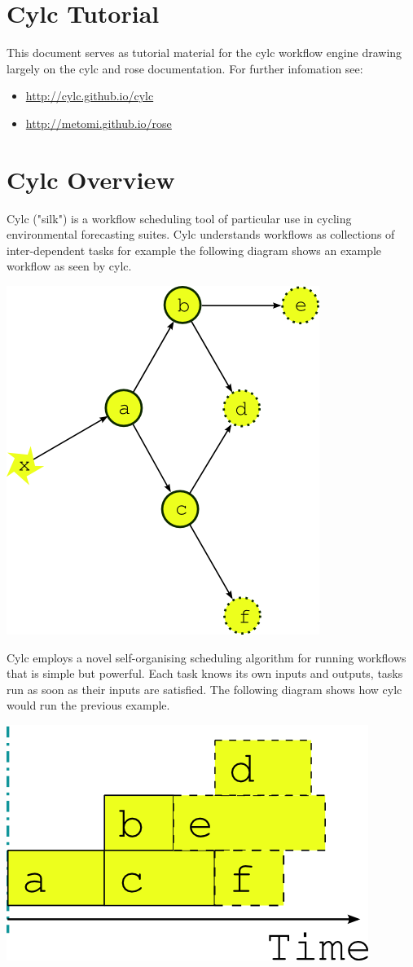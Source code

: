 \section*{Cylc Tutorial}

This document serves as tutorial material for the cylc workflow engine drawing
largely on the cylc and rose documentation. For further infomation see:

\begin{itemize}
    \item \url{http://cylc.github.io/cylc}
    \item \url{http://metomi.github.io/rose}
\end{itemize}


\section{Cylc Overview}

Cylc ("silk") is a workflow scheduling tool of particular use in cycling
environmental forecasting suites. Cylc understands workflows as collections of
inter-dependent tasks for example the following diagram shows an example
workflow as seen by cylc.

\begin{center}
    \includegraphics[width=0.4\columnwidth]{resources/tex/dep-one-cycle}
\end{center}
Cylc employs a novel self-organising scheduling algorithm for running
workflows that is simple but powerful. Each task knows its own
inputs and outputs, tasks run as soon as their inputs are satisfied. The
following diagram shows how cylc would run the previous example.

\begin{center}
    \includegraphics[width=0.3\columnwidth]{resources/tex/timeline-zero.png}
\end{center}

